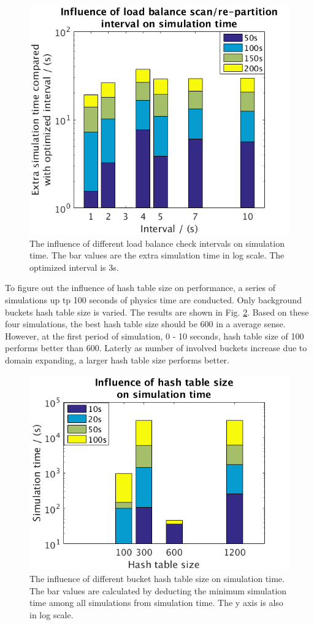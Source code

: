 \documentclass[conference,compsoc]{IEEEtran}
\begin{document}
\begin{figure}[!t]
\centering
\includegraphics[scale=0.35]{int_bar}
\caption{The influence of different load balance check intervals on simulation time. The bar values are the extra simulation time in log scale. The optimized interval is 3s.}
\label{fig:check_int}
\end{figure}
To figure out the influence of hash table size on performance, a series of simulations up tp 100 seconds of physics time are conducted. Only background buckets hash table size is varied. The results are shown in Fig. \ref{fig:bg_hashtb_size}. Based on these four simulations, the best hash table size should be 600 in a average sense. However, at the first period of simulation, 0 - 10 seconds, hash table size of 100 performs better than 600. Laterly as number of involved buckets increase due to domain expanding, a larger hash table size performs better.
\begin{figure}[!t]
\centering
\includegraphics[scale=0.35]{Bg_table_size}
\caption{The influence of different bucket hash table size on simulation time. The bar values are calculated by deducting the minimum simulation time among all simulations from simulation time. The y axis is also in log scale.}
\label{fig:bg_hashtb_size}
\end{figure}
\end{document}
